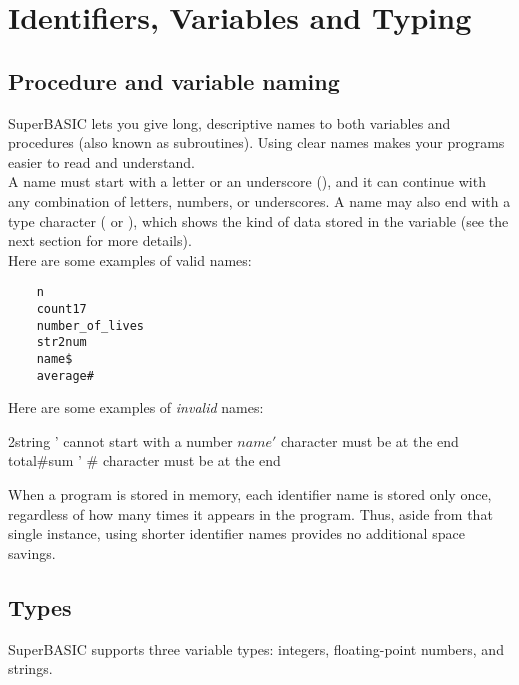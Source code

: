 \chapter{Identifiers, Variables and Typing}
\label{chap:variables}

\section{Procedure and variable naming}

SuperBASIC lets you give long, descriptive names to both variables and procedures (also known as subroutines). Using clear names makes your programs easier to read and understand.\\

A name must start with a letter or an underscore (\code{\_}), and it can continue with any combination of letters, numbers, or underscores. A name may also end with a type character (\code{\$} or \code{\#}), which shows the kind of data stored in the variable (see the next section for more details).\\

Here are some examples of valid names:

\begin{verbatim}
    n
    count17
    number_of_lives
    str2num
    name$
    average#
\end{verbatim}

Here are some examples of \textit{invalid} names: 

\begin{lst}
    2string     ' cannot start with a number
    $name       ' $ character must be at the end
    total#sum   ' # character must be at the end
\end{lst}

\begin{implnote}
When a program is stored in memory, each identifier name is stored only once, regardless of how many times it appears in the program. Thus, aside from that single instance, using shorter identifier names provides no additional space savings.
\end{implnote}

\section{Types}

SuperBASIC supports three variable types: integers, floating-point numbers, and strings.\\

